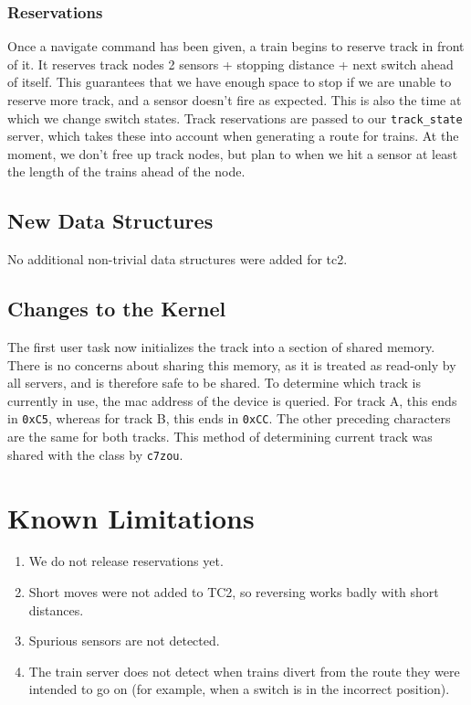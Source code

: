 \documentclass{article}
\begin{document}
\subsubsection{ Reservations}
Once a navigate command has been given, a train begins to reserve track in front of it. It reserves track nodes 2 sensors + stopping distance + next switch ahead of itself.
This guarantees that we have enough space to stop if we are unable to reserve more track, and a sensor doesn't fire as expected.
This is also the time at which we change switch states. Track reservations are passed to our \verb|track_state| server, which takes these into account when generating a route for trains.
At the moment, we don't free up track nodes, but plan to when we hit a sensor at least the length of the trains ahead of the node.

\subsection{New Data Structures}
    No additional non-trivial data structures were added for tc2.
\subsection{Changes to the Kernel}
    The first user task now initializes the track into a section of shared memory. There is no concerns about sharing this memory, as it is treated as read-only by all servers, and is therefore safe to be shared. 
    To determine which track is currently in use, the mac address of the device is queried. For track A, this ends in \texttt{0xC5}, whereas for track B, this ends in \texttt{0xCC}. 
    The other preceding characters are the same for both tracks. 
    This method of determining current track was shared with the class by \verb|c7zou|.

\section{Known Limitations}
\begin{enumerate}
\item We do not release reservations yet.
\item Short moves were not added to TC2, so reversing works badly with short distances.
\item Spurious sensors are not detected.
\item The train server does not detect when trains divert from the route they were intended to go on (for example, when a switch is in the incorrect position).

\end{enumerate}
\end{document}
